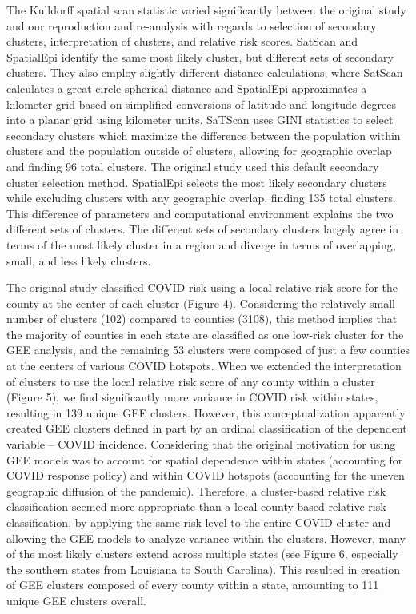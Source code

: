 \documentclass[
]{article}
\begin{document}
The Kulldorff spatial scan statistic varied significantly between the
original study and our reproduction and re-analysis with regards to
selection of secondary clusters, interpretation of clusters, and
relative risk scores. SatScan and SpatialEpi identify the same most
likely cluster, but different sets of secondary clusters. They also
employ slightly different distance calculations, where SatScan
calculates a great circle spherical distance and SpatialEpi approximates
a kilometer grid based on simplified conversions of latitude and
longitude degrees into a planar grid using kilometer units. SaTScan uses
GINI statistics to select secondary clusters which maximize the
difference between the population within clusters and the population
outside of clusters, allowing for geographic overlap and finding 96
total clusters. The original study used this default secondary cluster
selection method. SpatialEpi selects the most likely secondary clusters
while excluding clusters with any geographic overlap, finding 135 total
clusters. This difference of parameters and computational environment
explains the two different sets of clusters. The different sets of
secondary clusters largely agree in terms of the most likely cluster in
a region and diverge in terms of overlapping, small, and less likely
clusters.

The original study classified COVID risk using a local relative risk
score for the county at the center of each cluster (Figure 4).
Considering the relatively small number of clusters (102) compared to
counties (3108), this method implies that the majority of counties in
each state are classified as one low-risk cluster for the GEE analysis,
and the remaining 53 clusters were composed of just a few counties at
the centers of various COVID hotspots. When we extended the
interpretation of clusters to use the local relative risk score of any
county within a cluster (Figure 5), we find significantly more variance
in COVID risk within states, resulting in 139 unique GEE clusters.
However, this conceptualization apparently created GEE clusters defined
in part by an ordinal classification of the dependent variable -- COVID
incidence. Considering that the original motivation for using GEE models
was to account for spatial dependence within states (accounting for
COVID response policy) and within COVID hotspots (accounting for the
uneven geographic diffusion of the pandemic). Therefore, a cluster-based
relative risk classification seemed more appropriate than a local
county-based relative risk classification, by applying the same risk
level to the entire COVID cluster and allowing the GEE models to analyze
variance within the clusters. However, many of the most likely clusters
extend across multiple states (see Figure 6, especially the southern
states from Louisiana to South Carolina). This resulted in creation of
GEE clusters composed of every county within a state, amounting to 111
unique GEE clusters overall.
\end{document}
